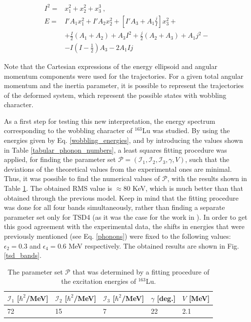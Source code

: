\documentclass[%
 reprint,
 amsmath,
 amssymb,
 aps,
 floatfix,
]{revtex4-2}
\begin{document}
\begin{align}
    I^2=&x_1^2+x_2^2+x_3^3\ ,\\
    E=&I'A_1x_1^2+I'A_2x_2^2+\left[I'A_3+A_1\frac{j}{I}\right]x_3^2+ \nonumber \\
    &+\frac{I}{2}(A_1+A_2)+A_3I^2+\frac{j}{2}(A_2+A_3)+A_1j^2- \nonumber \\
    &-I\left(I-\frac{1}{2}\right)A_3-2A_1Ij \label{ellipsoid_rotation}
\end{align}

Note that the Cartesian expressions of the energy ellipsoid and angular momentum components were used for the trajectories. For a given total angular momentum and the inertia parameter, it is possible to represent the trajectories of the deformed system, which represent the possible states with wobbling character.


As a first step for testing this new interpretation, the energy spectrum corresponding to the wobbling character of $^{163}$Lu was studied. By using the energies given by Eq. \ref{wobbling_energies}, and by introducing the values shown in Table \ref{tabular_phonon_numbers}, a least squares fitting procedure was applied, for finding the parameter set $\mathcal{P}=(\mathcal{I}_1,\mathcal{I}_2,\mathcal{I}_3,\gamma,V)$, such that the deviations of the theoretical values from the experimental ones \cite{odegaard2001evidence} are minimal. Thus, it was possible to find the numerical values of $\mathcal{P}$, with the results shown in Table \ref{parameter_set}. The obtained RMS value is $\approx 80$ KeV, which is much better than that obtained through the previous model. Keep in mind that the fitting procedure was done for all four bands simultaneously, rather than finding a separate parameter set only for TSD4 (as it was the case for the work in \cite{raduta2020new}). In order to get this good agreement with the experimental data, the shifts in energies that were previously mentioned (see Eq. \ref{phonons}) were fixed to the following values: $\epsilon_2=0.3$ and $\epsilon_4=0.6$ MeV respectively. The obtained results are shown in Fig. \ref{tsd_bands}.

\begin{table}[h]
    \centering
  \begin{tabular}{lllll}
  \hline
$\mathcal{I}_1$ [$\hbar^2$/MeV] & $\mathcal{I}_2$ [$\hbar^2$/MeV]& $\mathcal{I}_3$ [$\hbar^2$/MeV] & $\gamma$ [deg.] & $V$ [MeV] \\
\hline
\hline
72              & 15              & 7               & 22       & 2.1
\end{tabular}
    \caption{The parameter set $\mathcal{P}$ that was determined by a fitting procedure of the excitation energies of $^{163}$Lu.}
    \label{parameter_set}
\end{table}
\end{document}
